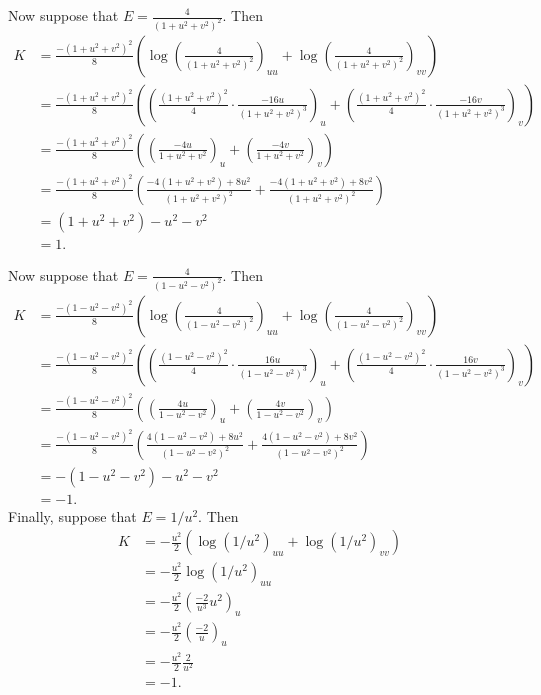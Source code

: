 \documentclass{article}
\theoremstyle{definition}
\begin{document}
Now suppose that $E = \frac{4}{(1 + u^2 + v^2)^2}$. Then
\begin{align*}
	K
	&=
	\frac{-(1 + u^2 + v^2)^2}{8}
	\left(
		\log\left(
			\frac{4}{(1 + u^2 + v^2)^2}
		\right)_{uu}
		+
		\log\left(
			\frac{4}{(1 + u^2 + v^2)^2}
		\right)_{vv}
	\right) \\
	&= 
	\frac{-(1 + u^2 + v^2)^2}{8}
	\left(
		\left(
			\frac{(1 + u^2 + v^2)^2}{4}
			\cdot
			\frac{-16u}{(1 + u^2 + v^2)^3}
		\right)_{u}
		+
		\left(
			\frac{(1 + u^2 + v^2)^2}{4}
			\cdot
			\frac{-16v}{(1 + u^2 + v^2)^3}
		\right)_{v}
	\right) \\
	&=
	\frac{-(1 + u^2 + v^2)^2}{8}
	\left(
		\left(
			\frac{-4u}{1 + u^2 + v^2}
		\right)_{u}
		+
		\left(
			\frac{-4v}{1 + u^2 + v^2}
		\right)_{v}
	\right) \\
	&=
	\frac{-(1 + u^2 + v^2)^2}{8}
	\left(
		\frac{-4(1 + u^2 + v^2) + 8u^2}{(1 + u^2 + v^2)^2}
		+
		\frac{-4(1 + u^2 + v^2) + 8v^2}{(1 + u^2 + v^2)^2}
	\right) \\
	&=
	(1 + u^2 + v^2) - u^2 - v^2 \\
	&=
	1.
\end{align*}

Now suppose that $E = \frac{4}{(1 - u^2 - v^2)^2}$. Then
\begin{align*}
	K
	&=
	\frac{-(1 - u^2 - v^2)^2}{8}
	\left(
		\log\left(
			\frac{4}{(1 - u^2 - v^2)^2}
		\right)_{uu}
		+
		\log\left(
			\frac{4}{(1 - u^2 - v^2)^2}
		\right)_{vv}
	\right) \\
	&= 
	\frac{-(1 - u^2 - v^2)^2}{8}
	\left(
		\left(
			\frac{(1 - u^2 - v^2)^2}{4}
			\cdot
			\frac{16u}{(1 - u^2 - v^2)^3}
		\right)_{u}
		+
		\left(
			\frac{(1 - u^2 - v^2)^2}{4}
			\cdot
			\frac{16v}{(1 - u^2 - v^2)^3}
		\right)_{v}
	\right) \\
	&=
	\frac{-(1 - u^2 - v^2)^2}{8}
	\left(
		\left(
			\frac{4u}{1 - u^2 - v^2}
		\right)_{u}
		+
		\left(
			\frac{4v}{1 - u^2 - v^2}
		\right)_{v}
	\right) \\
	&=
	\frac{-(1 - u^2 - v^2)^2}{8}
	\left(
		\frac{4(1 - u^2 - v^2) + 8u^2}{(1 - u^2 - v^2)^2}
		+
		\frac{4(1 - u^2 - v^2) + 8v^2}{(1 - u^2 - v^2)^2}
	\right) \\
	&=
	-(1 - u^2 - v^2) - u^2 - v^2 \\
	&=
	-1.
\end{align*}
Finally, suppose that $E = 1/u^2$. Then
\begin{align*}
	K
	&=
	-\frac{u^2}{2}
	\left(
		\log\left(
			1/u^2
		\right)_{uu}
		+
		\log\left(
			1/u^2
		\right)_{vv}
	\right) \\
	&= 
	-\frac{u^2}{2}
	\log\left( 1/u^2 \right)_{uu} \\
	&=
	-\frac{u^2}{2}
	\left(\frac{-2}{u^3} u^2\right)_u \\
	&=
	-\frac{u^2}{2}
	\left(\frac{-2}{u}\right)_u \\
	&=
	-\frac{u^2}{2}
	\frac{2}{u^2} \\
	&=
	-1.
\end{align*}
\end{document}
